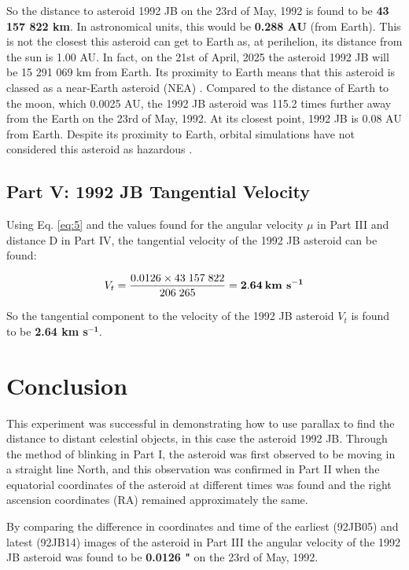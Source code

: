 \documentclass[12pt]{article}
\begin{document}
So the distance to asteroid 1992 JB on the 23rd of May, 1992 is found to be \textbf{43 157 822 km}. In astronomical units, this would be \textbf{0.288 AU} (from Earth). This is not the closest this asteroid can get to Earth as, at perihelion, its distance from the sun is 1.00 AU.
In fact, on the 21st of April, 2025 the asteroid 1992 JB will be 15 291 069 km from Earth. Its proximity to Earth means that this asteroid is classed as a near-Earth asteroid (NEA) \cite{1992jb}. 
Compared to the distance of Earth to the moon, which 0.0025 AU, the 1992 JB asteroid was 115.2 times further away from the Earth on the 23rd of May, 1992. At its closest point, 1992 JB is 0.08 AU from Earth. Despite its proximity to Earth, orbital simulations have not considered this asteroid as hazardous \cite{1992jb}. 

\subsection{Part V: 1992 JB Tangential Velocity}

Using Eq. \ref{eq:5} and the values found for the angular velocity $\mu$ in Part III and distance D in Part IV, the tangential velocity of the 1992 JB asteroid can be found:

\vspace{-2ex}
\begin{gather*}
    V_t = \frac{0.0126 \times 43 \; 157 \; 822}{206 \; 265} = \mathbf{2.64} \: \text{\textbf{km s}}\mathbf{^{-1}}
\end{gather*}

So the tangential component to the velocity of the 1992 JB asteroid $V_t$ is found to be \textbf{2.64 km s}$\mathbf{^{-1}}$.

\newpage

\section{Conclusion} \label{sec:4}

This experiment was successful in demonstrating how to use parallax to find the distance to distant celestial objects, in this case the asteroid 1992 JB. Through the method of blinking in Part I, the asteroid was first observed to be moving in a straight line North, and this observation
was confirmed in Part II when the equatorial coordinates of the asteroid at different times was found and the right ascension coordinates (RA) remained approximately the same.

By comparing the difference in coordinates and time of the earliest (92JB05) and latest (92JB14) images of the asteroid in Part III the angular velocity of the 1992 JB asteroid was found to be \textbf{0.0126 "} on the 23rd of May, 1992.
\end{document}
